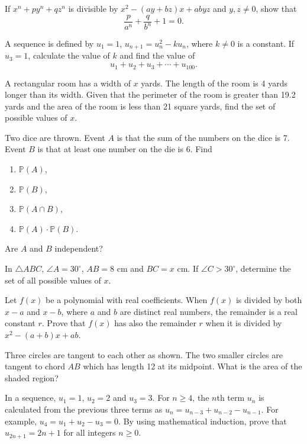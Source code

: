 \begin{problems}
    \problem If $x^{n} + py^{n} + qz^{n}$ is divisible by $x^2 - (ay + bz)x + abyz$ and $y, z \ne 0$, show that 
    \[\frac{p}{a^n} + \frac{q}{b^n} + 1 = 0.\] 

    \problem A sequence is defined by $u_{1} = 1$, $u_{n + 1} = u_{n}^2 - ku_{n}$, where $k \ne 0$ is a constant. If $u_{3} = 1$, calculate the value of $k$ and find the value of
    \[u_{1} + u_{2} + u_{3} + \cdots + u_{100}.\] 

    \problem A rectangular room has a width of $x$ yards. The length of the room is 4 yards longer than its width. Given that the perimeter of the room is greater than 19.2 yards and the area of the room is less than 21 square yards, find the set of possible values of $x$. 

    \problem Two dice are thrown. Event $A$ is that the sum of the numbers on the dice is 7. Event $B$ is that at least one number on the die is 6. Find 
    \begin{enumerate}
        \item $\mathbb{P}(A)$, 
        
        \item $\mathbb{P}(B)$,
        
        \item $\mathbb{P}(A \cap B)$, 
        
        \item $\mathbb{P}(A) \cdot \mathbb{P}(B)$.
    \end{enumerate}
    Are $A$ and $B$ independent? 

    \problem In $\triangle ABC$, $\angle A = 30^\circ$, $AB = 8$ cm and $BC = x$ cm. If $\angle C > 30^\circ$, determine the set of all possible values of $x$. 

    \problem Let $f(x)$ be a polynomial with real coefficients. When $f(x)$ is divided by both $x - a$ and $x - b$, where $a$ and $b$ are distinct real numbers, the remainder is a real constant $r$. Prove that $f(x)$ has also the remainder $r$ when it is divided by $x^2 - (a + b)x + ab$. 

    \problem Three circles are tangent to each other as shown. The two smaller circles are tangent to chord $AB$ which has length 12 at its midpoint. What is the area of the shaded region? 

    \problem In a sequence, $u_{1} = 1$, $u_{2} = 2$ and $u_{3} = 3$. For $n \geq 4$, the $n$th term $u_{n}$ is calculated from the previous three terms as $u_{n} = u_{n - 3} + u_{n - 2} - u_{n - 1}$. For example, $u _ {4} = u_{1} + u_{2} - u_{3} = 0$. By using mathematical induction, prove that $u_{2n + 1} = 2n + 1$ for all integers $n \geq 0$. 


\end{problems}
